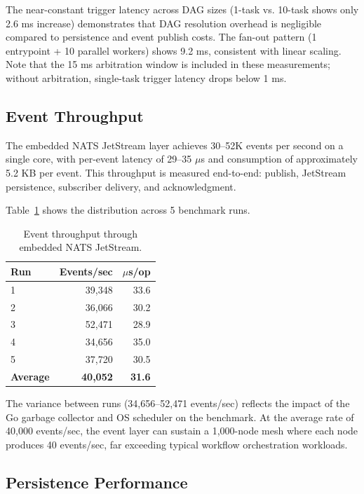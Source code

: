 \documentclass[sigconf]{acmart}
\begin{document}
The near-constant trigger latency across DAG sizes (1-task vs. 10-task shows only 2.6 ms increase) demonstrates that DAG resolution overhead is negligible compared to persistence and event publish costs. The fan-out pattern (1 entrypoint + 10 parallel workers) shows 9.2 ms, consistent with linear scaling. Note that the 15 ms arbitration window is included in these measurements; without arbitration, single-task trigger latency drops below 1 ms.

\subsection{Event Throughput}

The embedded NATS JetStream layer achieves 30--52K events per second on a single core, with per-event latency of 29--35 $\mu$s and consumption of approximately 5.2 KB per event. This throughput is measured end-to-end: publish, JetStream persistence, subscriber delivery, and acknowledgment.

Table~\ref{tab:event-throughput} shows the distribution across 5 benchmark runs.

\begin{table}[h]
\centering
\caption{Event throughput through embedded NATS JetStream.}
\label{tab:event-throughput}
\begin{tabular}{lrr}
\toprule
\textbf{Run} & \textbf{Events/sec} & \textbf{$\mu$s/op} \\
\midrule
1 & 39,348 & 33.6 \\
2 & 36,066 & 30.2 \\
3 & 52,471 & 28.9 \\
4 & 34,656 & 35.0 \\
5 & 37,720 & 30.5 \\
\midrule
\textbf{Average} & \textbf{40,052} & \textbf{31.6} \\
\bottomrule
\end{tabular}
\end{table}

The variance between runs (34,656--52,471 events/sec) reflects the impact of the Go garbage collector and OS scheduler on the benchmark. At the average rate of 40,000 events/sec, the event layer can sustain a 1,000-node mesh where each node produces 40 events/sec, far exceeding typical workflow orchestration workloads.

\subsection{Persistence Performance}
\end{document}
